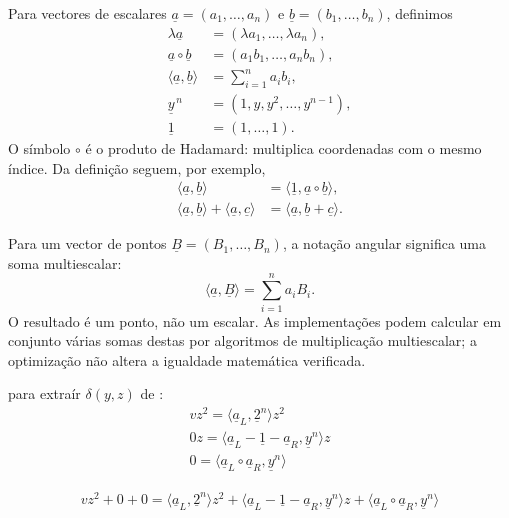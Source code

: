 \begin{appendices}
Para vectores de escalares
\(\underline a=(a_1,\ldots,a_n)\) e
\(\underline b=(b_1,\ldots,b_n)\), definimos
\begin{align*}
 \lambda\underline a
   &=(\lambda a_1,\ldots,\lambda a_n),\\
 \underline a\circ\underline b
   &=(a_1b_1,\ldots,a_nb_n),\\
 \langle\underline a,\underline b\rangle
   &=\sum_{i=1}^{n}a_ib_i,\\
 \underline y^{\,n}
   &=(1,y,y^2,\ldots,y^{n-1}),\\
 \underline 1&=(1,\ldots,1).
\end{align*}
O símbolo \(\circ\) é o produto de Hadamard: multiplica coordenadas com o
mesmo índice. Da definição seguem, por exemplo,
\begin{align*}
 \langle\underline a,\underline b\rangle
   &=\langle\underline1,\underline a\circ\underline b\rangle,\\
 \langle\underline a,\underline b\rangle
  +\langle\underline a,\underline c\rangle
   &=\langle\underline a,\underline b+\underline c\rangle.
\end{align*}

Para um vector de pontos
\(\underline B=(B_1,\ldots,B_n)\), a notação angular significa uma soma
multiescalar:
\[
 \langle\underline a,\underline B\rangle
   =\sum_{i=1}^{n}a_iB_i.
\]
O resultado é um ponto, não um escalar. As implementações podem calcular em
conjunto várias somas destas por algoritmos de multiplicação multiescalar; a
optimização não altera a igualdade matemática verificada.

\iffalse
para extraír $\delta(y, z)$ de :
\begin{align*}
vz^2 = \langle\underline{a}_L, \underline{2}^n\rangle z^2\\
0z = \langle\underline{a}_L - \underline{1} - \underline{a}_R, \underline{y}^n\rangle z\\
0 = \langle\underline{a}_L \circ \underline{a}_R, \underline{y}^n\rangle
\end{align*}

\begin{align*}
vz^2 + 0 + 0 = \langle\underline{a}_L, \underline{2}^n\rangle z^2 + \langle\underline{a}_L - \underline{1} - \underline{a}_R, \underline{y}^n\rangle z + \langle\underline{a}_L \circ \underline{a}_R, \underline{y}^n\rangle
\end{align*}


\end{appendices}

